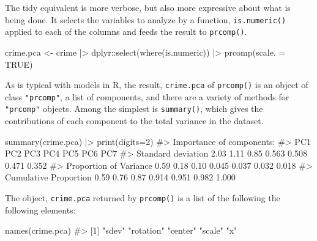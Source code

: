 \documentclass[
  letterpaper,
  10pt,
  krantz2]{krantz}
\makeatletter
\newenvironment{Shaded}{\begin{snugshade}}{\end{snugshade}}
\newcommand{\AttributeTok}[1]{\textcolor[rgb]{0.40,0.45,0.13}{#1}}
\newcommand{\CommentTok}[1]{\textcolor[rgb]{0.37,0.37,0.37}{#1}}
\newcommand{\ConstantTok}[1]{\textcolor[rgb]{0.56,0.35,0.01}{#1}}
\newcommand{\DecValTok}[1]{\textcolor[rgb]{0.68,0.00,0.00}{#1}}
\newcommand{\FunctionTok}[1]{\textcolor[rgb]{0.28,0.35,0.67}{#1}}
\newcommand{\NormalTok}[1]{\textcolor[rgb]{0.00,0.23,0.31}{#1}}
\newcommand{\OtherTok}[1]{\textcolor[rgb]{0.00,0.23,0.31}{#1}}
\newcommand{\SpecialCharTok}[1]{\textcolor[rgb]{0.37,0.37,0.37}{#1}}
\newenvironment{kframe}{%
  \medskip{}
  \setlength{\fboxsep}{.8em}
  \def\at@end@of@kframe{}%
  \ifinner\ifhmode%
  \def\at@end@of@kframe{\end{minipage}}%
  \begin{minipage}{\columnwidth}%
  \fi\fi%
  \def\FrameCommand##1{\hskip\@totalleftmargin \hskip-\fboxsep
  \colorbox{shadecolor}{##1}\hskip-\fboxsep
      \hskip-\linewidth \hskip-\@totalleftmargin \hskip\columnwidth}%
  \MakeFramed {\advance\hsize-\width
    \@totalleftmargin\z@ \linewidth\hsize
    \@setminipage}}%
{\par\unskip\endMakeFramed%
  \at@end@of@kframe}
\renewenvironment{Shaded}{\begin{kframe}}{\end{kframe}}
\makeatother
\begin{document}
The tidy equivalent is more verbose, but also more expressive about what
is being done. It selects the variables to analyze by a function,
\texttt{is.numeric()} applied to each of the columns and feeds the
result to \texttt{prcomp()}.

\begin{Shaded}
\begin{Highlighting}[]
\NormalTok{crime.pca }\OtherTok{\textless{}{-}} 
\NormalTok{  crime }\SpecialCharTok{|\textgreater{}} 
\NormalTok{  dplyr}\SpecialCharTok{::}\FunctionTok{select}\NormalTok{(}\FunctionTok{where}\NormalTok{(is.numeric)) }\SpecialCharTok{|\textgreater{}}
  \FunctionTok{prcomp}\NormalTok{(}\AttributeTok{scale. =} \ConstantTok{TRUE}\NormalTok{)}
\end{Highlighting}
\end{Shaded}

As is typical with models in R, the result, \texttt{crime.pca} of
\texttt{prcomp()} is an object of class \texttt{"prcomp"}, a list of
components, and there are a variety of methods for \texttt{"prcomp"}
objects. Among the simplest is \texttt{summary()}, which gives the
contributions of each component to the total variance in the dataset.

\begin{Shaded}
\begin{Highlighting}[]
\FunctionTok{summary}\NormalTok{(crime.pca) }\SpecialCharTok{|\textgreater{}} \FunctionTok{print}\NormalTok{(}\AttributeTok{digits=}\DecValTok{2}\NormalTok{)}
\CommentTok{\#\textgreater{} Importance of components:}
\CommentTok{\#\textgreater{}                         PC1  PC2  PC3   PC4   PC5   PC6   PC7}
\CommentTok{\#\textgreater{} Standard deviation     2.03 1.11 0.85 0.563 0.508 0.471 0.352}
\CommentTok{\#\textgreater{} Proportion of Variance 0.59 0.18 0.10 0.045 0.037 0.032 0.018}
\CommentTok{\#\textgreater{} Cumulative Proportion  0.59 0.76 0.87 0.914 0.951 0.982 1.000}
\end{Highlighting}
\end{Shaded}

The object, \texttt{crime.pca} returned by \texttt{prcomp()} is a list
of the following the following elements:

\begin{Shaded}
\begin{Highlighting}[]
\FunctionTok{names}\NormalTok{(crime.pca)}
\CommentTok{\#\textgreater{} [1] "sdev"     "rotation" "center"   "scale"    "x"}
\end{Highlighting}
\end{Shaded}
\end{document}
